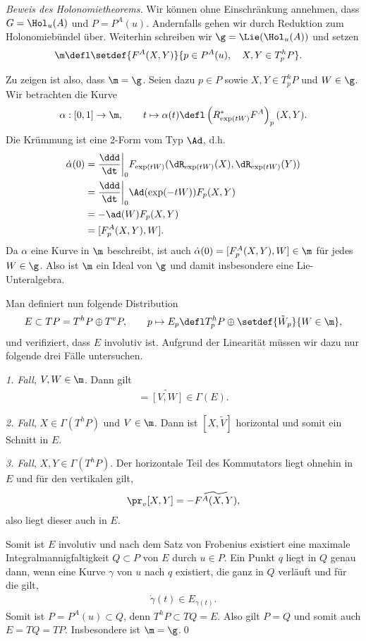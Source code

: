 \documentclass[%
	paper=a5,%
	fleqn,%
	DIV=18,%
	BCOR=0mm,
	fontsize=11pt,
	titlepage=false,%
	bibliography=totoc,
	DIV=18,%
	twoside=true,
	pdftitle=Riemannsche Geometrie,
	pdfauthor=Uwe Semmelmann,
	numbers=noendperiod]%
	{scrbook}
\begin{document}
\begin{proof}[Beweis des Holonomietheorems]
Wir können ohne Einschränkung annehmen, dass $G=\Hol_{u}(A)$ und $P=P^A(u)$. Andernfalls gehen wir durch Reduktion zum Holonomiebündel über. Weiterhin schreiben wir $\g = \Lie(\Hol_{u}(A))$ und setzen
\begin{align*}
\m \defl \span\setdef{F^A(X,Y)}{p\in P^A(u),\quad X,Y\in T_{p}^hP}.
\end{align*}

Zu zeigen ist also, dass $\m = \g$. Seien dazu $p\in P$ sowie $X,Y\in T^h_{p}P$ und $W\in \g$. Wir betrachten die Kurve
\begin{align*}
\alpha: [0,1] \to \m,\qquad t\mapsto \alpha(t) \defl \left(R_{\exp(tW)}^* F^A\right)_{p}(X,Y).
\end{align*}
Die Krümmung ist eine 2-Form vom Typ $\Ad$, d.h.
\begin{align*}
\dot{\alpha}(0) &=  \frac{\ddd}{\dt}\bigg|_{0} F_{\exp(tW)}(\dR_{\exp(tW)}(X),\dR_{\exp(tW)}(Y))\\
&= \frac{\ddd}{\dt}\bigg|_{0} \Ad(\exp(-tW))F_{p}(X,Y)\\
&= -\ad(W) F_{p}(X,Y)\\
&= [F_{p}^A(X,Y),W].
\end{align*}
Da $\alpha$ eine Kurve in $\m$ beschreibt, ist auch $\dot{\alpha}(0)=[F_{p}^A(X,Y),W]\in\m$ für jedes $W\in\g$. Also ist $\m$ ein Ideal von $\g$ und damit insbesondere eine Lie-Unteralgebra.

Man definiert nun folgende Distribution
\begin{align*}
E \subset TP = T^hP\oplus T^vP,\qquad 
p\mapsto E_{p}\defl T_{p}^hP\oplus \setdef{\tilde{W}_{p}}{W\in \m},
\end{align*}
und verifiziert, dass $E$ involutiv ist. Aufgrund der Linearität müssen wir dazu nur folgende drei Fälle untersuchen.

\textit{1. Fall}, $V,W\in \m$. Dann gilt
\begin{align*}
[\tilde{V},\tilde{W}] = \widetilde{[V,W]} \in \Gamma(E).
\end{align*}

\textit{2. Fall}, $X\in \Gamma(T^hP)$ und $V\in \m$. Dann ist $[X,\tilde{V}]$ horizontal und somit ein Schnitt in $E$.

\textit{3. Fall}, $X,Y\in \Gamma(T^hP)$. Der horizontale Teil des Kommutators liegt ohnehin in $E$ und für den vertikalen gilt,
\begin{align*}
\pr_{v}[X,Y] = - \widetilde{F^A(X,Y)},
\end{align*}
also liegt dieser auch in $E$.

Somit ist $E$ involutiv und nach dem Satz von Frobenius existiert eine maximale Integralmannigfaltigkeit $Q\subset P$ von $E$ durch $u\in P$.
Ein Punkt $q$ liegt in $Q$ genau dann, wenn eine Kurve $\gamma$ von $u$ nach $q$ existiert, die ganz in $Q$  verläuft und für die gilt,
\begin{align*}
\dot{\gamma}(t) \in E_{\gamma(t)}.
\end{align*}
Somit ist $P=P^A(u)\subset Q$, denn $T^hP\subset TQ=E$. Also gilt $P=Q$ und somit auch $E=TQ=TP$. Insbesondere ist $\m = \g$.\qed
\end{proof}
\end{document}
